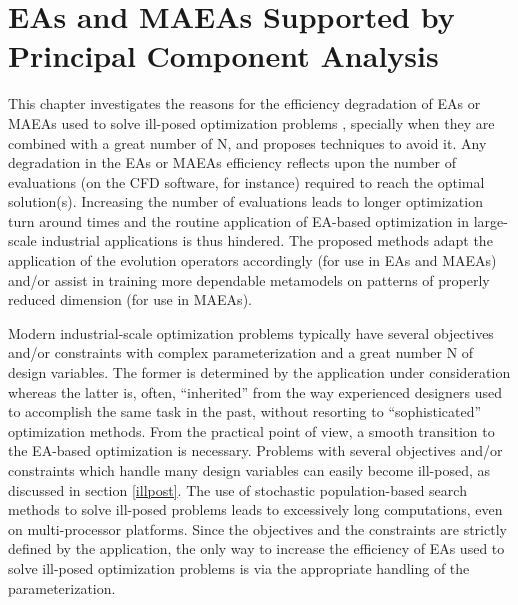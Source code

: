 \ifpdf
    \graphicspath{{4/figures/PNG/}{4/figures/PDF/}{3/figures/}}
\else
    \graphicspath{{4/figures/EPS/}{4/figures/}}
\fi

\chapter{EAs and MAEAs Supported by Principal Component Analysis} %
\label{VarCorrChapter}

This chapter investigates the reasons for the efficiency degradation of EAs or MAEAs used to solve ill-posed optimization problems \cite{Salomon,Roy_2002a,Ghisu_2010}, specially when they are combined with a great number of N, and proposes techniques to avoid it. Any degradation in the EAs or MAEAs efficiency reflects upon the number of evaluations (on the CFD software, for instance) required to reach the optimal solution(s).  Increasing the number of evaluations leads to longer optimization turn around times and the routine application of EA-based optimization in large-scale industrial applications is thus hindered. The proposed methods adapt the application of the evolution operators accordingly (for use in EAs and MAEAs) and/or assist in training more dependable metamodels on patterns of properly reduced dimension (for use in MAEAs).

Modern industrial-scale optimization problems typically have several objectives and/or constraints with complex parameterization and a great number N of design variables. The former is determined by the application under consideration whereas the latter is, often, ``inherited'' from the way experienced designers used to accomplish the same task in the past, without resorting to ``sophisticated'' optimization methods. From the practical point of view, a smooth transition to the EA-based optimization is necessary. Problems with several objectives and/or constraints which handle many design variables can easily become ill-posed, as discussed in section \ref{illpost}. The use of stochastic population-based search methods to solve ill-posed problems leads to excessively long computations, even on multi-processor platforms. Since the objectives and the constraints are strictly defined by the application, the only way to increase the efficiency of EAs used to solve ill-posed optimization problems is via the appropriate handling of the parameterization. 

